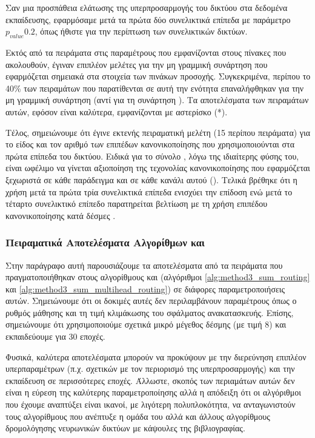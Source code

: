 Σαν μια προσπάθεια ελάτωσης της υπερπροσαρμογής του δικτύου στα δεδομένα εκπαίδευσης, εφαρμόσαμε μετά τα πρώτα δύο συνελικτικά επίπεδα με παράμετρο $p_{value} 0.2$, όπως ήθιστε για την περίπτωση των συνελικτικών δικτύων.\par

Εκτός από τα πειράματα στις παραμέτρους που εμφανίζονται στους πίνακες που ακολουθούν, έγιναν επιπλέον μελέτες για την μη γραμμική συνάρτηση που εφαρμόζεται σημειακά στα στοιχεία των πινάκων προσοχής. Συγκεκριμένα, περίπου το 40\% των πειραμάτων που παρατίθενται σε αυτή την ενότητα επαναλήφθηκαν για την μη γραμμική συνάρτηση  (αντί για τη συνάρτηση ). Τα αποτελέσματα των πειραμάτων αυτών, εφόσον είναι καλύτερα, εμφανίζονται με αστερίσκο (*).\par

Τέλος, σημειώνουμε ότι έγινε εκτενής πειραματική μελέτη (15 περίπου πειράματα) για το είδος και τον αριθμό των επιπέδων κανονικοποίησης που χρησιμοποιούνται στα πρώτα επίπεδα του δικτύου. Ειδικά για το σύνολο , λόγω της ιδιαίτερης φύσης του, είναι ωφέλιμο να γίνεται αξιοποίηση της τεχονολίας κανονικοποίησης που εφαρμόζεται ξεχωριστά σε κάθε παράδειγμα και σε κάθε κανάλι αυτού (). Τελικά βρέθηκε ότι η χρήση  μετά τα πρώτα τρία συνελικτικά επίπεδα ενισχύει την επίδοση ενώ μετά το τέταρτο συνελικτικό επίπεδο παρατηρείται βελτίωση με τη χρήση επιπέδου κανονικοποίησης κατά δέσμες .

\subsubsection{Πειραματικά Αποτελέσματα Αλγορίθμων  και }
Στην παράγραφο αυτή παρουσιάζουμε τα αποτελέσματα από τα πειράματα που πραγματοποιήθηκαν στους αλγορίθμους  και  (αλγόριθμοι \ref{alg:method3_sum_routing} και \ref{alg:method3_sum_multihead_routing}) σε διάφορες παραμετροποιήσεις αυτών. Σημειώνουμε ότι οι δοκιμές αυτές δεν περιλαμβάνουν παραμέτρους όπως ο ρυθμός μάθησης και τη τιμή κλιμάκωσης του σφάλματος ανακατασκευής. Επίσης, σημειώνουμε ότι χρησιμοποιούμε σχετικά μικρό μέγεθος δέσμης (με τιμή 8) και εκπαιδεύουμε για 30 εποχές.\par 

Φυσικά, καλύτερα αποτελέσματα μπορούν να προκύψουν με την διερεύνηση επιπλέον υπερπαραμέτρων (π.χ. σχετικών με τον περιορισμό της υπερπροσαρμογής) και την εκπαίδευση σε περισσότερες εποχές. Άλλωστε, σκοπός των περιαμάτων αυτών δεν είναι η εύρεση της καλύτερης παραμετροποίησης αλλά η απόδειξη ότι οι αλγόριθμοι που έχουμε αναπτύξει είναι ικανοί, με λιγότερη πολυπλοκότητα, να ανταγωνιστούν τους αλγορίθμους που ανέπτυξε η ομάδα του  αλλά και άλλους αλγορίθμους δρομολόγησης νευρωνικών δικτύων με κάψουλες της βιβλιογραφίας.\par

